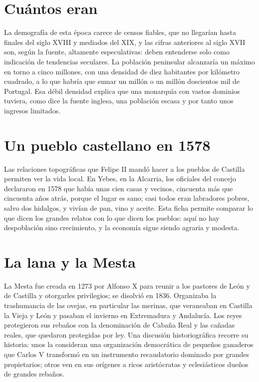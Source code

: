 \documentclass{book}
\begin{document}
\section{Cuántos eran}

La demografía de esta época carece de censos fiables, que no llegarían hasta finales del siglo XVIII y mediados del XIX, y las cifras anteriores al siglo XVII son, según la fuente, altamente especulativas: deben entenderse solo como indicación de tendencias seculares. La población peninsular alcanzaría un máximo en torno a cinco millones, con una densidad de diez habitantes por kilómetro cuadrado, a lo que habría que sumar un millón o un millón doscientos mil de Portugal. Esa débil densidad explica que una monarquía con vastos dominios tuviera, como dice la fuente inglesa, una población escasa y por tanto unos ingresos limitados.


\section{Un pueblo castellano en 1578}

Las relaciones topográficas que Felipe II mandó hacer a los pueblos de Castilla permiten ver la vida local. En Yebes, en la Alcarria, los oficiales del concejo declararon en 1578 que había unas cien casas y vecinos, cincuenta más que cincuenta años atrás, porque el lugar es sano; casi todos eran labradores pobres, salvo dos hidalgos, y vivían de pan, vino y aceite. Esta ficha permite comparar lo que dicen los grandes relatos con lo que dicen los pueblos: aquí no hay despoblación sino crecimiento, y la economía sigue siendo agraria y modesta.


\section{La lana y la Mesta}

La Mesta fue creada en 1273 por Alfonso X para reunir a los pastores de León y de Castilla y otorgarles privilegios; se disolvió en 1836. Organizaba la trashumancia de las ovejas, en particular las merinas, que veraneaban en Castilla la Vieja y León y pasaban el invierno en Extremadura y Andalucía. Los reyes protegieron sus rebaños con la denominación de Cabaña Real y las cañadas reales, que quedaron protegidas por ley. Una discusión historiográfica recorre su historia: unos la consideran una organización democrática de pequeños ganaderos que Carlos V transformó en un instrumento recaudatorio dominado por grandes propietarios; otros ven en sus orígenes a ricos aristócratas y eclesiásticos dueños de grandes rebaños.
\end{document}
